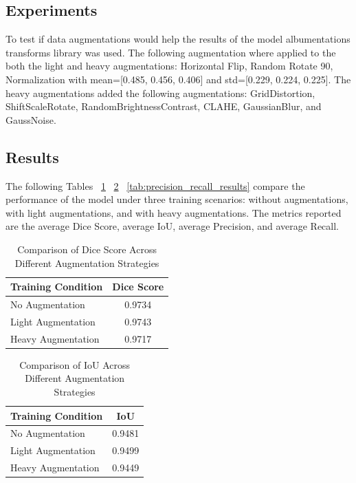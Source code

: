 \documentclass[10pt,twocolumn,letterpaper]{article}
\begin{document}
\subsection{Experiments}
To test if data augmentations would help the results of the model albumentations transforms library was used. The following augmentation where applied to the both the light and heavy augmentations: Horizontal Flip, Random Rotate 90, Normalization with mean=[0.485, 0.456, 0.406] and std=[0.229, 0.224, 0.225]. The heavy augmentations added the following augmentations: GridDistortion, ShiftScaleRotate, RandomBrightnessContrast, CLAHE, GaussianBlur, and GaussNoise.



\subsection{Results}
The following Tables ~\ref{tab:dice_score_results}  ~\ref{tab:iou_results} ~\ref{tab:precision_recall_results} compare the performance of the model under three training scenarios: without augmentations, with light augmentations, and with heavy augmentations. The metrics reported are the average Dice Score, average IoU, average Precision, and average Recall. 
\begin{table}[h!]
\centering
\begin{tabular}{l|c|}
\hline
\bf{Training Condition} & \bf{Dice Score} \\ \hline
No Augmentation & 0.9734 \\ \hline
Light Augmentation & 0.9743 \\ \hline
Heavy Augmentation & 0.9717 \\ \hline
\end{tabular}
\caption{Comparison of Dice Score Across Different Augmentation Strategies}
\label{tab:dice_score_results}
\end{table}

\begin{table}[h!]
\centering
\begin{tabular}{l|c|}
\hline
\bf{Training Condition} & \bf{IoU} \\ \hline
No Augmentation & 0.9481 \\ \hline
Light Augmentation & 0.9499 \\ \hline
Heavy Augmentation & 0.9449 \\ \hline
\end{tabular}
\caption{Comparison of IoU Across Different Augmentation Strategies}
\label{tab:iou_results}
\end{table}
\end{document}
